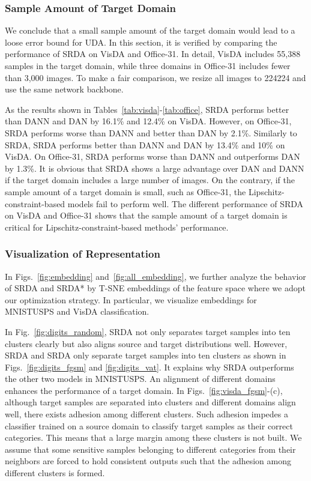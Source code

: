 \documentclass[journal,twocolumn]{IEEEtran}
\theoremstyle{definition}
\begin{document}
\subsubsection{Sample Amount of Target Domain}
We conclude that a small sample amount of the target domain would lead to a loose error bound for UDA. In this section, it is verified by comparing the performance of SRDA on VisDA and Office-31. In detail, VisDA includes 55,388 samples in the target domain,  while three domains in Office-31 includes fewer than 3,000 images. To make a fair comparison, we resize all images to 224224 and use the same network backbone. 

As the results shown in Tables~\ref{tab:visda}-\ref{tab:office}, SRDA performs better than DANN and DAN by 16.1\% and 12.4\% on VisDA. However, on Office-31, SRDA performs worse than DANN and better than DAN by 2.1\%. Similarly to SRDA, SRDA performs better than DANN and DAN by 13.4\% and 10\% on VisDA. On Office-31, SRDA performs worse than DANN and outperforms DAN by 1.3\%. It is obvious that SRDA shows a large advantage over DAN and DANN if the target domain includes a large number of images. On the contrary, if the sample amount of a target domain is small, such as Office-31, the Lipschitz-constraint-based models fail to perform well. The different performance of SRDA on VisDA and Office-31 shows that the sample amount of a target domain is critical for Lipschitz-constraint-based methods' performance.

\subsubsection{Visualization of Representation}

In Figs.~\ref{fig:embedding} and~\ref{fig:all_embedding}, we further analyze the behavior of SRDA and SRDA* by T-SNE embeddings of the feature space where we adopt our optimization strategy. In particular, we visualize embeddings for MNISTUSPS and VisDA classification. 

In Fig.~\ref{fig:digits_random}, SRDA not only separates target samples into ten clusters clearly but also aligns source and target distributions well. However, SRDA and SRDA only separate target samples into ten clusters as shown in Figs.~\ref{fig:digits_fgsm} and \ref{fig:digits_vat}. It explains why SRDA outperforms the other two models in MNISTUSPS. An alignment of different domains enhances the performance of a target domain. In Figs.~\ref{fig:visda_fgsm}-(c), although target samples are separated into clusters and different domains align well, there exists adhesion among different clusters. Such adhesion impedes a classifier trained on a source domain to classify target samples as their correct categories. This means that a large margin among these clusters is not built. We assume that some sensitive samples belonging to different categories from their neighbors are forced to hold consistent outputs such that the adhesion among different clusters is formed.
\end{document}
